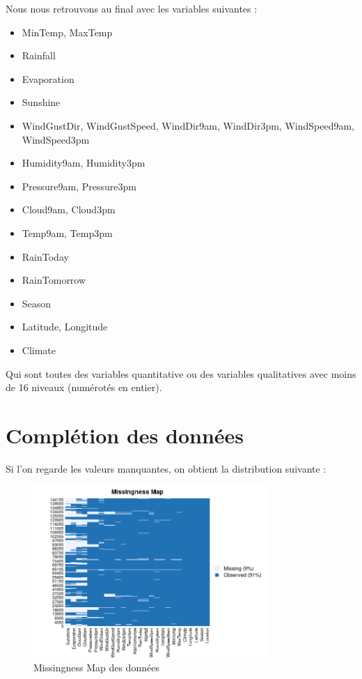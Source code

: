 \documentclass{article}
\begin{document}
Nous nous retrouvons au final avec les variables suivantes : 
\begin{itemize}
    \item MinTemp, MaxTemp
    \item Rainfall
    \item Evaporation
    \item Sunshine
    \item WindGustDir, WindGustSpeed, WindDir9am, WindDir3pm, WindSpeed9am, WindSpeed3pm
    \item Humidity9am, Humidity3pm
    \item Pressure9am, Pressure3pm
    \item Cloud9am, Cloud3pm
    \item Temp9am, Temp3pm
    \item RainToday
    \item RainTomorrow
    \item Season
    \item Latitude, Longitude
    \item Climate
\end{itemize}
Qui sont toutes des variables quantitative ou des variables qualitatives avec moins de 16 niveaux (numérotés en entier).

\section{Complétion des données}

Si l'on regarde les valeurs manquantes, on obtient la distribution suivante : 

\begin{figure}[H]
    \centering
    \includegraphics[width=0.8\textwidth]{Images/missmap.png}
    \caption{Missingness Map des données}
\end{figure}
\end{document}
